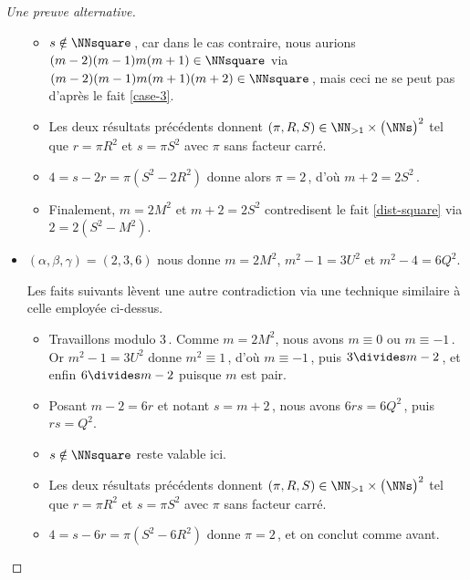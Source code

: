 \begin{proof}[Une preuve alternative]
\begin{itemize}
\begin{itemize}
			\item $s \notin \NNsquare$\,, car dans le cas contraire, nous aurions $(m-2)(m-1)m(m+1) \in \NNsquare$ via $(m-2)(m-1)m(m+1)(m+2)  \in \NNsquare$\,, mais ceci ne se peut pas d'après le fait \ref{case-3}.
			
			\item Les deux résultats précédents donnent $(\pi, R, S) \in \NN_{>1} \times \big( \NNs \big)^2$ tel que $r = \pi R^2$ et $s = \pi S^2$ avec $\pi$ sans facteur carré.
			
			\item $4 = s - 2r = \pi (S^2 - 2 R^2)$ donne alors $\pi = 2$\,, d'où $m + 2 = 2 S^2$\,.
			
			\item Finalement, $m = 2 M^2$ et $m + 2 = 2 S^2$ contredisent le fait \ref{dist-square} via $2 = 2(S^2 - M^2)$.
		\end{itemize}



		\item $(\alpha, \beta, \gamma) = (2, 3, 6)$ nous donne $m = 2 M^2$, $m^2 - 1 = 3 U^2$ et $m^2 - 4 = 6 Q^2$.
		
		\noindent
		Les faits suivants lèvent une autre contradiction via une technique similaire à celle employée ci-dessus.
		\begin{itemize}
			\item Travaillons modulo $3$\,.
			Comme $m = 2 M^2$, nous avons $m \equiv 0$ ou $m \equiv -1$\,. 
			Or $m^2 - 1 = 3 U^2$ donne $m^2 \equiv 1$\,, d'où $m \equiv -1$\,, puis $3 \divides m - 2$\,, et enfin $6 \divides m - 2$ puisque $m$ est pair.
			
			\item Posant $m - 2 = 6 r$ et notant $s = m + 2$\,, nous avons $6 r s = 6 Q^2$\,, puis $r s = Q^2$.
			
			\item $s \notin \NNsquare$ reste valable ici.
			
			\item Les deux résultats précédents donnent $(\pi, R, S) \in \NN_{>1} \times \big( \NNs \big)^2$ tel que $r = \pi R^2$ et $s = \pi S^2$ avec $\pi$ sans facteur carré.
			
			\item $4 = s - 6r = \pi (S^2 - 6 R^2)$ donne $\pi = 2$\,, et on conclut comme avant. \qedhere
		\end{itemize} \qedhere
	\end{itemize}
\end{proof}
